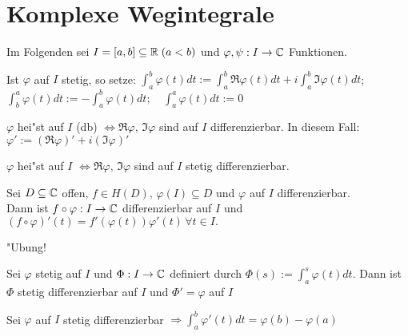 \documentclass[a4paper,twoside,DIV15,BCOR12mm]{scrbook}
\begin{document}
\chapter{Komplexe Wegintegrale}

Im Folgenden sei $I= [a,b] \subseteq \mathbb{R} \; (a<b)$ und $\varphi,\psi: I \rightarrow \mathbb{C}$ Funktionen.

\begin{definition}
\begin{liste}
\item Ist $\varphi$ auf $I$ stetig, so setze: $\int_a^b \varphi(t)dt := \int_a^b \Re \varphi(t)dt + i \int_a^b \Im \varphi(t)dt$; \quad $\int_b^a \varphi(t)dt := -\int_a^b \varphi(t)dt; \quad \int_a^a \varphi(t)dt := 0$
\item $\varphi$ hei"st auf $I$  (db) $\Leftrightarrow \Re \varphi, \, \Im \varphi$ sind auf $I$ differenzierbar.
In diesem Fall: $\varphi' := (\Re \varphi)' + i(\Im \varphi)'$
\item $\varphi$ hei"st auf $I$  $\Leftrightarrow \Re \varphi, \, \Im \varphi$ sind auf $I$ stetig differenzierbar.\\
\end{liste}
\end{definition}

\begin{samepage}\begin{satz}
Sei $D \subseteq \mathbb{C}$ offen, $f\in H(D), \, \varphi(I) \subseteq D$ und $\varphi$ auf $I$ differenzierbar.\\
 Dann ist $f \circ \varphi: I \rightarrow \mathbb{C}$ differenzierbar auf $I$ und $(f \circ \varphi)'(t) = f'(\varphi(t))\varphi'(t) \, \forall t \in I.$
\end{satz}\end{samepage}

\begin{beweis}
"Ubung!
\end{beweis}

\begin{samepage}\begin{satz}
\begin{liste}
\item Sei $\varphi$ stetig auf $I$ und $\Phi: I \rightarrow \mathbb{C}$ definiert durch $\Phi(s):= \int_a^s \varphi(t)dt$. Dann ist $\Phi$ stetig differenzierbar auf $I$ und $\Phi' = \varphi$ auf $I$
\item Sei $\varphi$ auf $I$ stetig differenzierbar $\Rightarrow \int_a^b \varphi'(t)dt = \varphi(b) - \varphi(a)$
\end{liste}
\end{satz}\end{samepage}
\end{document}
